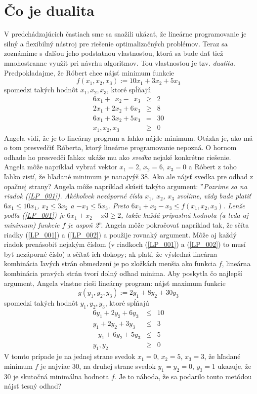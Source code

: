 \section{Čo je dualita}

\noindent
V predchádzajúcich častiach sme sa snažili ukázať, že lineárne programovanie je
silný a flexibilný nástroj pre riešenie optimalizačných problémov. Teraz sa zoznámime s ďalšou 
jeho podstatnou vlastnosťou, ktorá sa bude dať tiež mnohostranne využiť pri návrhu
algoritmov. Tou vlastnosťou je tzv. {\em dualita}. 
Predpokladajme, že Róbert chce  nájsť minimum funkcie 
$$f(x_1,x_2,x_3):=10x_1+3x_2+5x_3$$ 
spomedzi takých hodnôt $x_1, x_2, x_3$, ktoré spĺňajú
\begin{eqnarray}
\label{LP_001}6x_1 + \phantom{2}x_2 - \phantom{3}x_3&\ge&2\\
\label{LP_002}2x_1 + 2x_2 + 6x_3&\ge&8\\
6x_1 + 3x_2 + 5x_3&=&30\nonumber\\
x_1,x_2,x_3&\ge&0\nonumber
\end{eqnarray}
Angela vidí, že je to lineárny program a ľahko nájde minimum. Otázka je, ako má 
o tom presvedčiť Róberta, ktorý lineárne programovanie nepozná. 
O hornom odhade ho presvedčí ľahko: ukáže mu ako {\em svedka} nejaké konkrétne riešenie. Angela môže
napríklad vybrať vektor $x_1=2$, $x_2=6$, $x_3=0$ a Róbert z toho ľahko zistí, že hľadané minimum
je nanajvýš $38$. Ako ale nájsť svedka pre odhad z opačnej strany? Angela môže napríklad skúsiť 
takýto argument: ''{\em Pozrime sa na riadok (\ref{LP_001}). Akékoľvek nezáporné čísla $x_1$,
  $x_2$, $x_3$ zvolíme, vždy bude platiť $6x_1\le10x_1$, $x_2\le3x_2$ a $-x_3\le5x_3$. Preto
  $6x_1+x_2-x_3\le f(x_1,x_2,x_3)$. Lenže podľa  (\ref{LP_001}) je $6x_1+x_2-x3\ge2$,
takže každá prípustná hodnota (a teda aj minimum) funkcie $f$ je aspoň 2}''.
Angela môže pokračovať napríklad tak, že sčíta riadky (\ref{LP_001}) a (\ref{LP_002})
a použije rovnaký argument. Môže aj každý riadok prenásobiť nejakým číslom (v 
riadkoch (\ref{LP_001}) a (\ref{LP_002})
to musí byť nezáporné číslo) a sčítať ich dokopy; ak platí, že výsledná lineárna kombinácia
ľavých strán obmedzení 
je po zložkách menšia ako funkcia $f$, lineárna kombinácia pravých strán tvorí dolný odhad minima.
Aby poskytla čo najlepší argument, Angela vlastne rieši lineárny program:
nájsť maximum funkcie
$$g(y_1,y_2,y_3):=2 y_1+8 y_2+30 y_3$$
spomedzi takých hodnôt $y_1, y_2, y_3$, ktoré spĺňajú
\begin{eqnarray*}
6y_1 + 2y_2 + 6y_3 &\le& 10\\
y_1 + 2y_2 + 3y_3 &\le& 3\\
-y_1 + 6y_2 + 5y_3 &\le& 5\\
y_1,y_2 &\ge& 0
\end{eqnarray*}
V tomto prípade je na jednej strane svedok $x_1=0$, $x_2=5$, $x_3=3$, že hľadané minimum $f$ je najviac 30,
na druhej strane svedok $y_1=y_2=0$, $y_3=1$ ukazuje, že 30 je skutočná minimálna hodnota $f$.
Je to náhoda, že sa podarilo touto metódou nájsť tesný odhad?

